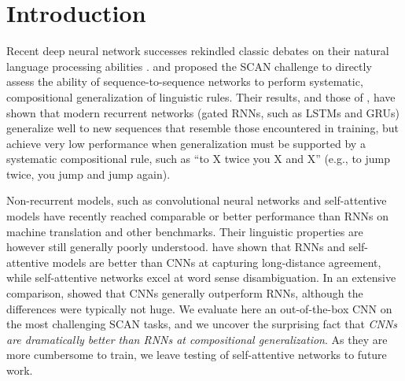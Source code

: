 \section{Introduction}
\label{sec:intro}

Recent deep neural network successes rekindled classic
debates on their natural language processing abilities
\cite[e.g.,][]{Kirov:Cotterell:2018,McCoy:etal:2018,Pater:2018}. \citet{Lake:Baroni:2017}
and \citet{Loula:etal:2018} proposed the SCAN challenge to
directly assess the ability of sequence-to-sequence networks to
perform systematic, compositional generalization of linguistic
rules. Their results, and those of \citet{Bastings:etal:2018}, have
shown that modern recurrent networks (gated RNNs, such as LSTMs and GRUs) generalize well
to new sequences that resemble those encountered in training,
but achieve very low performance when generalization must be
supported by a systematic compositional rule, such as ``to X twice 
you X and X'' (e.g., to jump twice, you jump and jump again).

Non-recurrent models, such as convolutional neural networks
\cite[CNNs,][]{kalchbrenner:etal:2016, gehring:etal:2016,
  gehring:etal:2017} and self-attentive models
\cite{vaswani:etal:2017, chen:etal:2018} have recently reached
comparable or better performance than RNNs on machine translation and
other benchmarks. Their linguistic properties are however still
generally poorly understood.  have shown that
RNNs and self-attentive models are better than CNNs at capturing
long-distance agreement, while self-attentive networks excel at word
sense disambiguation. In an extensive comparison,
 showed that CNNs generally outperform RNNs,
although the differences were typically not huge. We evaluate here an out-of-the-box CNN on the most
challenging SCAN tasks, and we uncover the surprising fact that
\emph{CNNs are dramatically better than RNNs at compositional
  generalization}. As they are more cumbersome to train, we leave
testing of self-attentive networks to future work.


